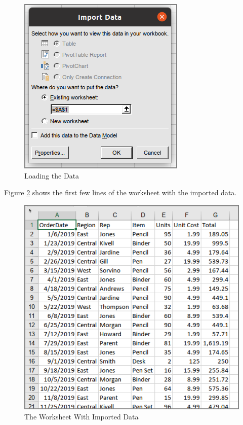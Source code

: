 \begin{figure}[H]
	\centering
	\includegraphics[width=\maxwidth{.95\linewidth}]{gfx/ch07_fig10}
	\caption{Loading the Data}
	\label{07:fig10}
\end{figure}

Figure \ref{07:fig11} shows the first few lines of the worksheet with the imported data.

\begin{figure}[H]
	\centering
	\includegraphics[width=\maxwidth{.95\linewidth}]{gfx/ch07_fig11}
	\caption{The Worksheet With Imported Data}
	\label{07:fig11}
\end{figure}


